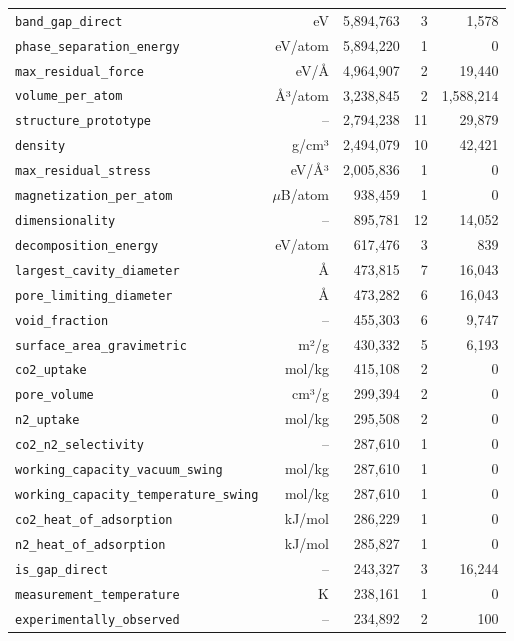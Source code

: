 \begin{longtable}{lrrrr}
\texttt{band\_gap\_direct} & eV & 5{,}894{,}763 & 3 & 1{,}578 \\
\texttt{phase\_separation\_energy} & eV/atom & 5{,}894{,}220 & 1 & 0 \\
\texttt{max\_residual\_force} & eV/Å & 4{,}964{,}907 & 2 & 19{,}440 \\
\texttt{volume\_per\_atom} & Å³/atom & 3{,}238{,}845 & 2 & 1{,}588{,}214 \\
\texttt{structure\_prototype} & -- & 2{,}794{,}238 & 11 & 29{,}879 \\
\texttt{density} & g/cm³ & 2{,}494{,}079 & 10 & 42{,}421 \\
\texttt{max\_residual\_stress} & eV/Å³ & 2{,}005{,}836 & 1 & 0 \\
\texttt{magnetization\_per\_atom} & $\mu$B/atom & 938{,}459 & 1 & 0 \\
\texttt{dimensionality} & -- & 895{,}781 & 12 & 14{,}052 \\
\texttt{decomposition\_energy} & eV/atom & 617{,}476 & 3 & 839 \\
\texttt{largest\_cavity\_diameter} & Å & 473{,}815 & 7 & 16{,}043 \\
\texttt{pore\_limiting\_diameter} & Å & 473{,}282 & 6 & 16{,}043 \\
\texttt{void\_fraction} & -- & 455{,}303 & 6 & 9{,}747 \\
\texttt{surface\_area\_gravimetric} & m²/g & 430{,}332 & 5 & 6{,}193 \\
\texttt{co2\_uptake} & mol/kg & 415{,}108 & 2 & 0 \\
\texttt{pore\_volume} & cm³/g & 299{,}394 & 2 & 0 \\
\texttt{n2\_uptake} & mol/kg & 295{,}508 & 2 & 0 \\
\texttt{co2\_n2\_selectivity} & -- & 287{,}610 & 1 & 0 \\
\texttt{working\_capacity\_vacuum\_swing} & mol/kg & 287{,}610 & 1 & 0 \\
\texttt{working\_capacity\_temperature\_swing} & mol/kg & 287{,}610 & 1 & 0 \\
\texttt{co2\_heat\_of\_adsorption} & kJ/mol & 286{,}229 & 1 & 0 \\
\texttt{n2\_heat\_of\_adsorption} & kJ/mol & 285{,}827 & 1 & 0 \\
\texttt{is\_gap\_direct} & -- & 243{,}327 & 3 & 16{,}244 \\
\texttt{measurement\_temperature} & K & 238{,}161 & 1 & 0 \\
\texttt{experimentally\_observed} & -- & 234{,}892 & 2 & 100 \\

\end{longtable}
